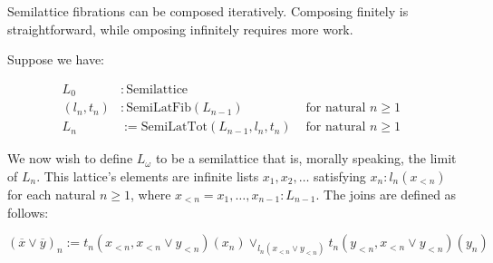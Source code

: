 \documentclass{article}
\begin{document}
      Semilattice fibrations can be composed iteratively. Composing finitely is straightforward, while omposing infinitely requires more work.

      Suppose we have:

      \begin{align*}
        L_0 &: \mathrm{Semilattice} & \\
        (l_n, t_n) &: \mathrm{SemiLatFib}(L_{n-1}) & \text{ for natural $n \geq 1$ } \\
        L_n &:= \mathrm{SemiLatTot}(L_{n-1}, l_n, t_n)    & \text{ for natural $n \geq 1$ }
      \end{align*}

      We now wish to define $L_\omega$ to be a semilattice that is, morally speaking, the limit of $L_n$. This lattice's elements are infinite lists $x_1, x_2, \ldots$ satisfying $x_n : l_n(x_{<n})$ for each natural $n \geq 1$, where $x_{<n} = x_1, \ldots, x_{n-1} : L_{n-1}$. The joins are defined as follows:

      $$(\overline{x} \vee \overline{y})_n := t_n(x_{<n}, x_{<n} \vee y_{<n})(x_n) \vee_{l_n(x_{<n} \vee y_{<n})} t_n(y_{<n}, x_{<n} \vee y_{<n})(y_n)$$
\end{document}
